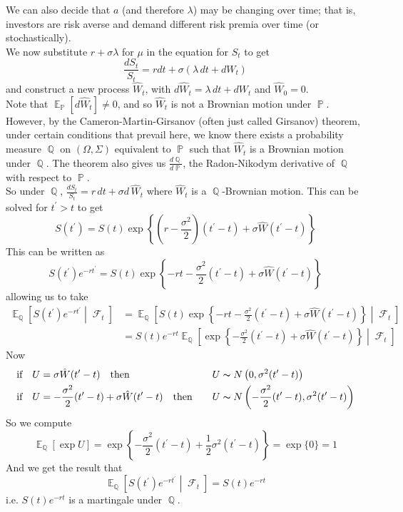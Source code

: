 \documentclass[11pt]{article}
\theoremstyle{definition}
\theoremstyle{remark}
\DeclareMathOperator{\Exp}{\mathbb{E}}
\DeclareMathOperator{\Que}{\mathbb{Q}}
\DeclareMathOperator{\Prob}{\mathbb{P}}
\DeclareMathOperator{\Filtr}{\mathcal{F}}
\begin{document}
We can also decide that $a$ (and therefore $\lambda$) may be changing over time; that is, investors are risk averse and demand different risk premia over time (or stochastically). \\

We now substitute $r + \sigma \lambda$ for $\mu$ in the equation for $S_t$ to get
$$\frac{d S_t}{S_t} = r d t + \sigma \left( \lambda\,dt+ dW_t \right)$$
and construct a new process $\hat{W}_t$, with $d \hat{W}_t = \lambda\,dt + dW_t$ and $\hat{W}_0 = 0$. \\

Note that $\Exp_{\Prob}[d \hat{W}_t] \neq 0$, and so $\hat{W}_t$ is not a Brownian motion under $\Prob$. However, by the Cameron-Martin-Girsanov (often just called Girsanov) theorem, under certain conditions that prevail here, we know there exists a probability measure $\Que$ on $(\Omega, \Sigma)$ equivalent to $\Prob$ such that $\hat{W}_t$ is a Brownian motion under $\Que$. The theorem also gives us $\frac{d \Que}{d \Prob}$, the Radon-Nikodym derivative of $\Que$ with respect to $\Prob$. \\

So under $\Que$, $\frac{d S_t}{S_t} = r\,dt + \sigma d\,\hat{W}_t$ where $\hat{W}_t$ is a $\Que$-Brownian motion. This can be solved for $t^\prime > t$ to get 
$$ S(t^\prime) = S(t) \exp \left\{ \left(r - \frac{\sigma^2}{2}\right)(t^\prime - t) + \sigma \hat{W}(t^\prime - t) \right\} $$
This can be written as 
$$ S(t^\prime)e^{-r t^\prime} = S(t) \exp \left\{-rt -\frac{\sigma^2}{2}(t^\prime - t) + \sigma \hat{W}(t^\prime - t) \right\} $$
allowing us to take
\begin{align*}
\Exp_{\Que}\left[S(t^\prime)e^{-r t^\prime}\middle| \Filtr_t \right]
& = \Exp_{\Que}\left[S(t) \exp \left\{-rt -\frac{\sigma^2}{2}(t^\prime - t) + \sigma \hat{W}(t^\prime - t) \right\}\middle| \Filtr_t \right] \\
& = S(t)e^{-rt}\Exp_{\Que}\left[ \exp \left\{-\frac{\sigma^2}{2}(t^\prime - t) + \sigma \hat{W}(t^\prime - t) \right\}\middle| \Filtr_t \right]
\end{align*}
Now
\begin{align*}
\text{if} \quad U &= \sigma \hat{W}(t^\prime - t) \quad \text{then}& \quad U &\thicksim N\left(0, \sigma^2(t^\prime - t)\right) \\
\text{if} \quad U &= -\frac{\sigma^2}{2}(t^\prime - t) + \sigma \hat{W}(t^\prime - t) \quad \text{then}& \quad U &\thicksim N\left(-\frac{\sigma^2}{2}(t^\prime - t), \sigma^2(t^\prime - t)\right)
\end{align*}
So we compute
$$ \Exp_{\Que}[\exp U] = \exp \left\{ -\frac{\sigma^2}{2}(t^\prime - t) + \frac{1}{2} \sigma^2(t^\prime - t) \right\} = \exp\{0\} = 1$$
And we get the result that 
$$ \Exp_{\Que}\left[S(t^\prime)e^{-r t^\prime}\middle| \Filtr_t \right]
= S(t)e^{-r t}$$
i.e. $S(t)e^{-r t}$ is a martingale under $\Que$. \\
\end{document}
